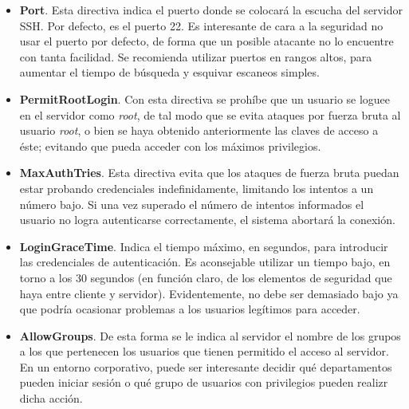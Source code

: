 \documentclass[a4paper, 11pt, titlepage]{article}
\begin{document}
        \begin{itemize}
            \item \textbf{Port}. Esta directiva indica el puerto donde se colocará la escucha del servidor 
            SSH. Por defecto, es el puerto 22. Es interesante de cara a la seguridad no usar el puerto por defecto, 
            de forma que un posible atacante no lo encuentre con tanta facilidad. Se recomienda utilizar puertos en 
            rangos altos, para aumentar el tiempo de búsqueda y esquivar escaneos simples.
            \item \textbf{PermitRootLogin}. Con esta directiva se prohíbe que un usuario se loguee en el servidor
            como \textit{root}, de tal modo que se evita ataques por fuerza bruta al usuario \textit{root}, o 
            bien se haya obtenido anteriormente las claves de acceso a éste; evitando que pueda acceder con 
            los máximos privilegios.
            \item \textbf{MaxAuthTries}. Esta directiva evita que los ataques de fuerza bruta puedan estar probando 
            credenciales indefinidamente, limitando los intentos a un número bajo. Si una vez superado el número de 
            intentos informados el usuario no logra autenticarse correctamente, el sistema abortará la conexión.
            \item \textbf{LoginGraceTime}. Indica el tiempo máximo, en segundos, para introducir las credenciales de 
            autenticación. Es aconsejable utilizar un tiempo bajo, en torno a los 30 segundos (en función claro, de los 
            elementos de seguridad que haya entre cliente y servidor). Evidentemente, no debe ser demasiado bajo 
            ya que podría ocasionar problemas a los usuarios legítimos para acceder.
            \item \textbf{AllowGroups}. De esta forma se le indica al servidor el nombre de los grupos a los que 
            pertenecen los usuarios que tienen permitido el acceso al servidor. En un entorno corporativo, puede ser 
            interesante decidir qué departamentos pueden iniciar sesión o qué grupo de usuarios con privilegios 
            pueden realizr dicha acción.


\end{itemize}
\end{document}

